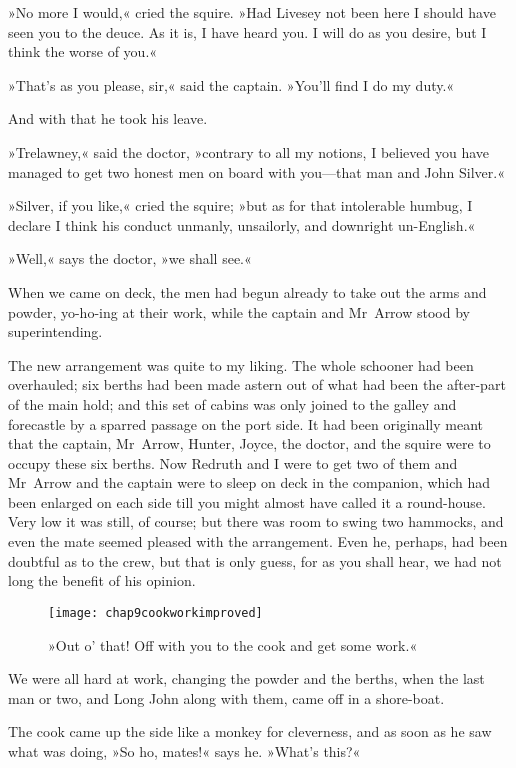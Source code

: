 »No more I would,« cried the squire. »Had Livesey not been here I should have seen you to the deuce. As it is, I have heard you. I will do as you desire, but I think the worse of you.«

»That's as you please, sir,« said the captain. »You'll find I do my duty.«

And with that he took his leave.

»Trelawney,« said the doctor, »contrary to all my notions, I believed you have managed to get two honest men on board with you—that man and John Silver.«

»Silver, if you like,« cried the squire; »but as for that intolerable humbug, I declare I think his conduct unmanly, unsailorly, and downright un-English.«

»Well,« says the doctor, »we shall see.«

When we came on deck, the men had begun already to take out the arms and powder, yo-ho-ing at their work, while the captain and Mr~Arrow stood by superintending.

The new arrangement was quite to my liking. The whole schooner had been overhauled; six berths had been made astern out of what had been the after-part of the main hold; and this set of cabins was only joined to the galley and forecastle by a sparred passage on the port side. It had been originally meant that the captain, Mr~Arrow, Hunter, Joyce, the doctor, and the squire were to occupy these six berths. Now Redruth and I were to get two of them and Mr~Arrow and the captain were to sleep on deck in the companion, which had been enlarged on each side till you might almost have called it a round-house. Very low it was still, of course; but there was room to swing two hammocks, and even the mate seemed pleased with the arrangement. Even he, perhaps, had been doubtful as to the crew, but that is only guess, for as you shall hear, we had not long the benefit of his opinion.

\begin{figure}[p]
\centering
\texttt{[image: chap9cookworkimproved]}
\caption[»Off with you to the cook and get some work.«]{»Out o' that! Off with you to the cook and get some work.«}
\end{figure}

We were all hard at work, changing the powder and the berths, when the last man or two, and Long John along with them, came off in a shore-boat.

The cook came up the side like a monkey for cleverness, and as soon as he saw what was doing, »So ho, mates!« says he. »What's this?«

